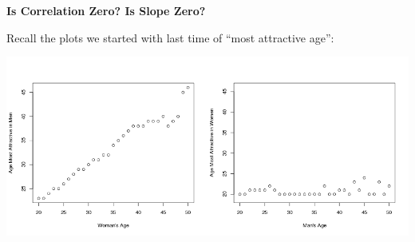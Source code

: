 \def\theTopic{Testing Slope = 0 }
\def\dayNum{18 }

\begin{center}

{\bf {\large Is Correlation Zero?  Is Slope Zero?}}
\end{center}

Recall the plots we started with last time of ``most attractive age'':
\vspace{-.5cm}

\includegraphics[width=\linewidth]{../plots/attractiveAges.png}

